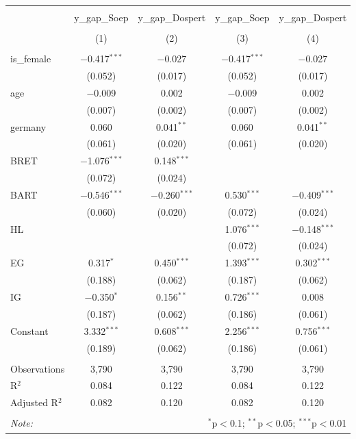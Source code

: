 \documentclass[12pt]{article}
\begin{document}
\begin{table}[H] \centering 

  \label{} 
\small 
\begin{tabular}{@{\extracolsep{-5pt}}lcccc} 
\\[-1.8ex]\\[-1.8ex] & y\_gap\_Soep & y\_gap\_Dospert & y\_gap\_Soep & y\_gap\_Dospert \\ 
\\[-1.8ex] & (1) & (2) & (3) & (4)\\ 
\hline \\[-1.8ex] 
 is\_female & $-$0.417$^{***}$ & $-$0.027 & $-$0.417$^{***}$ & $-$0.027 \\ 
  & (0.052) & (0.017) & (0.052) & (0.017) \\ 
  age & $-$0.009 & 0.002 & $-$0.009 & 0.002 \\ 
  & (0.007) & (0.002) & (0.007) & (0.002) \\ 
  germany & 0.060 & 0.041$^{**}$ & 0.060 & 0.041$^{**}$ \\ 
  & (0.061) & (0.020) & (0.061) & (0.020) \\ 
  BRET & $-$1.076$^{***}$ & 0.148$^{***}$ &  &  \\ 
  & (0.072) & (0.024) &  &  \\ 
  BART & $-$0.546$^{***}$ & $-$0.260$^{***}$ & 0.530$^{***}$ & $-$0.409$^{***}$ \\ 
  & (0.060) & (0.020) & (0.072) & (0.024) \\ 
  HL &  &  & 1.076$^{***}$ & $-$0.148$^{***}$ \\ 
  &  &  & (0.072) & (0.024) \\ 
  EG & 0.317$^{*}$ & 0.450$^{***}$ & 1.393$^{***}$ & 0.302$^{***}$ \\ 
  & (0.188) & (0.062) & (0.187) & (0.062) \\ 
  IG & $-$0.350$^{*}$ & 0.156$^{**}$ & 0.726$^{***}$ & 0.008 \\ 
  & (0.187) & (0.062) & (0.186) & (0.061) \\ 
  Constant & 3.332$^{***}$ & 0.608$^{***}$ & 2.256$^{***}$ & 0.756$^{***}$ \\ 
  & (0.189) & (0.062) & (0.186) & (0.061) \\ 
 \hline \\[-1.8ex] 
Observations & 3,790 & 3,790 & 3,790 & 3,790 \\ 
R$^{2}$ & 0.084 & 0.122 & 0.084 & 0.122 \\ 
Adjusted R$^{2}$ & 0.082 & 0.120 & 0.082 & 0.120 \\ 
\hline \\[-1.8ex] 
\textit{Note:}  & \multicolumn{4}{r}{$^{*}$p$<$0.1; $^{**}$p$<$0.05; $^{***}$p$<$0.01} \\ 
\end{tabular} 
\end{table} 
\newpage
\end{document}
